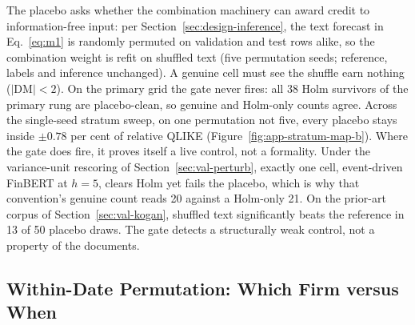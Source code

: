 The placebo asks whether the combination machinery can award credit to information-free input: per Section~\ref{sec:design-inference}, the text forecast in Eq.~\eqref{eq:m1} is randomly permuted on validation and test rows alike, so the combination weight is refit on shuffled text (five permutation seeds; reference, labels and inference unchanged). A genuine cell must see the shuffle earn nothing ($|\mathrm{DM}| < 2$). On the primary grid the gate never fires: all 38 Holm survivors of the primary rung are placebo-clean, so genuine and Holm-only counts agree. Across the single-seed stratum sweep, on one permutation not five, every placebo stays inside $\pm0.78$ per cent of relative QLIKE (Figure~\ref{fig:app-stratum-map-b}). %
Where the gate does fire, it proves itself a live control, not a formality. Under the variance-unit rescoring of Section~\ref{sec:val-perturb}, exactly one cell, event-driven FinBERT at $h{=}5$, clears Holm yet fails the placebo, which is why that convention's genuine count reads 20 against a Holm-only 21. %
On the prior-art corpus of Section~\ref{sec:val-kogan}, shuffled text significantly beats the reference in 13 of 50 placebo draws. The gate detects a structurally weak control, not a property of the documents. %

\subsection{Within-Date Permutation: Which Firm versus When}
\label{sec:val-withindate}

